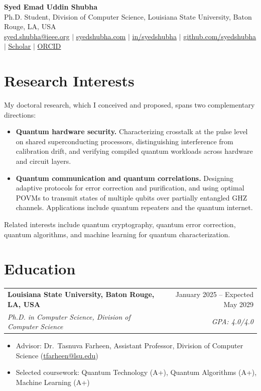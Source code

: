 \documentclass[letterpaper,11pt]{article}
\makeatletter
\newcommand{\cvlink}[2]{\href{#1}{\underline{#2}}}
\newcommand{\cventry}[4]{%
  \begin{tabularx}{\textwidth}{@{}X r@{}}
    \textbf{#1} & #2 \\
    \textit{#3} & \textit{#4}
  \end{tabularx}\par\vspace{1pt}}
\newenvironment{cvblock}
  {\par\noindent\begin{minipage}[t]{\textwidth}\raggedright}
  {\end{minipage}\par\vspace{5pt}}
\makeatother
\begin{document}
\begin{center}
  {\Huge\bfseries Syed Emad Uddin Shubha}\\[4pt]
  Ph.D. Student, Division of Computer Science, Louisiana State University, Baton Rouge, LA, USA\\[3pt]
  \small
  \cvlink{mailto:syed.shubha@ieee.org}{syed.shubha@ieee.org} \;$|$\;
  \cvlink{https://syedshubha.com/}{syedshubha.com} \;$|$\;
  \cvlink{https://www.linkedin.com/in/syedshubha/}{in/syedshubha} \;$|$\;
  \cvlink{https://github.com/syedshubha}{github.com/syedshubha} \;$|$\;
  \cvlink{https://scholar.google.com/citations?user=8EK8VJMAAAAJ}{Scholar} \;$|$\;
  \cvlink{https://orcid.org/0009-0005-1435-5958}{ORCID}
\end{center}

\section{Research Interests}
My doctoral research, which I conceived and proposed, spans two complementary directions:
\begin{itemize}
  \item \textbf{Quantum hardware security.} Characterizing crosstalk at the pulse level on shared superconducting processors, distinguishing interference from calibration drift, and verifying compiled quantum workloads across hardware and circuit layers.
  \item \textbf{Quantum communication and quantum correlations.} Designing adaptive protocols for error correction and purification, and using optimal POVMs to transmit states of multiple qubits over partially entangled GHZ channels. Applications include quantum repeaters and the quantum internet.
\end{itemize}
Related interests include quantum cryptography, quantum error correction, quantum algorithms, and machine learning for quantum characterization.

\section{Education}

\begin{cvblock}
\cventry{Louisiana State University, Baton Rouge, LA, USA}{January 2025 -- Expected May 2029}
        {Ph.D. in Computer Science, Division of Computer Science}{GPA: 4.0/4.0}
\begin{itemize}
  \item Advisor: Dr.~Tasnuva Farheen, Assistant Professor, Division of Computer Science (\cvlink{mailto:tfarheen@lsu.edu}{tfarheen@lsu.edu})
  \item Selected coursework: Quantum Technology (A+), Quantum Algorithms (A+), Machine Learning (A+)
\end{itemize}
\end{cvblock}
\end{document}
